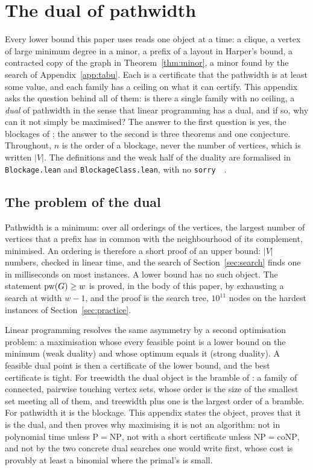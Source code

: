 \section{The dual of pathwidth}
\label{app:dual}

Every lower bound this paper uses reads one object at a time: a clique, a
vertex of large minimum degree in a minor, a prefix of a layout in Harper's
bound, a contracted copy of the graph in Theorem~\ref{thm:minor}, a minor
found by the search of Appendix~\ref{app:tabu}. Each is a certificate that
the pathwidth is at least some value, and each family has a ceiling on what
it can certify. This appendix asks the question behind all of them: is there
a single family with no ceiling, a \emph{dual} of pathwidth in the sense that
linear programming has a dual, and if so, why can it not simply be maximised?
The answer to the first question is yes, the blockages of
\citet{BRST1991}; the answer to the second is three theorems and one
conjecture. Throughout, $n$ is the order of a blockage, never the number of
vertices, which is written $|V|$. The definitions and the weak half of the
duality are formalised in \texttt{Blockage.lean} and
\texttt{BlockageClass.lean}, with no
\texttt{sorry}~~.

\subsection{The problem of the dual}

Pathwidth is a minimum: over all orderings of the vertices, the largest
number of vertices that a prefix has in common with the neighbourhood of its
complement, minimised. An ordering is therefore a short proof of an upper
bound: $|V|$ numbers, checked in linear time, and the search of
Section~\ref{sec:search} finds one in milliseconds on most instances. A lower
bound has no such object. The statement $\mathrm{pw}(G)\ge w$ is proved, in the body
of this paper, by exhausting a search at width $w-1$, and the proof is the
search tree, $10^{11}$ nodes on the hardest instances of Section~\ref{sec:practice}.

Linear programming resolves the same asymmetry by a second optimisation
problem: a maximisation whose every feasible point is a lower bound on the
minimum (weak duality) and whose optimum equals it (strong duality). A
feasible dual point is then a certificate of the lower bound, and the best
certificate is tight. For treewidth the dual object is the bramble of
\citet{SeymourThomas1993}: a family of connected, pairwise touching vertex
sets, whose order is the size of the smallest set meeting all of them, and
treewidth plus one is the largest order of a bramble. For pathwidth it is the
blockage. This appendix states the object, proves that it is the dual, and
then proves why maximising it is not an algorithm: not in polynomial time
unless $\mathrm P=\mathrm{NP}$, not with a short certificate unless
$\mathrm{NP}=\mathrm{coNP}$, and not by the two concrete dual searches one
would write first, whose cost is provably at least a binomial where the
primal's is small.

